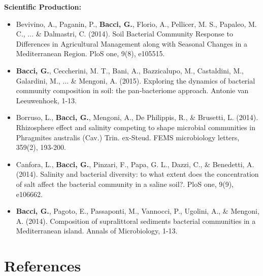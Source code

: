 \documentclass[10pt]{beamer}
\begin{document}
\begin{frame}
	\textbf{\Large{Scientific Production:}}
	\footnotesize{%
	\begin{itemize}
		\item Bevivino, A., Paganin, P., \textbf{Bacci, G.}, Florio, A., Pellicer, M. S., Papaleo, M. C., ... \& Dalmastri, C. (2014). Soil Bacterial Community Response to Differences in Agricultural Management along with Seasonal Changes in a Mediterranean Region. PloS one, 9(8), e105515.
		\item \textbf{Bacci, G.}, Ceccherini, M. T., Bani, A., Bazzicalupo, M., Castaldini, M., Galardini, M., ... \& Mengoni, A. (2015). Exploring the dynamics of bacterial community composition in soil: the pan-bacteriome approach. Antonie van Leeuwenhoek, 1-13.
		\item Borruso, L., \textbf{Bacci, G.}, Mengoni, A., De Philippis, R., \& Brusetti, L. (2014). Rhizosphere effect and salinity competing to shape microbial communities in Phragmites australis (Cav.) Trin. ex-Steud. FEMS microbiology letters, 359(2), 193-200.
		\item Canfora, L., \textbf{Bacci, G.}, Pinzari, F., Papa, G. L., Dazzi, C., \& Benedetti, A. (2014). Salinity and bacterial diversity: to what extent does the concentration of salt affect the bacterial community in a saline soil?. PloS one, 9(9), e106662.
		\item \textbf{Bacci, G.}, Pagoto, E., Passaponti, M., Vannocci, P., Ugolini, A., \& Mengoni, A. (2014). Composition of supralittoral sediments bacterial communities in a Mediterranean island. Annals of Microbiology, 1-13.
	\end{itemize}
	}
\end{frame}


\section{References}
\subsection{}
\begin{frame}[allowframebreaks] 
	\tiny
	
\end{frame}
\end{document}
